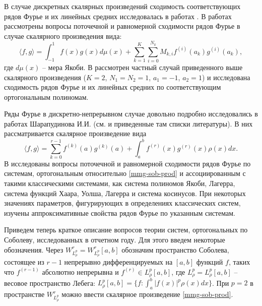 В случае дискретных скалярных произведений сходимость соответствующих рядов Фурье и их линейных средних исследовалась в работах \cite{mmg-Marcellan2002, mmg-Rocha2003, mmg-OsilenkerFourier2012, mmg-OsilenkerLinearMethods2015, mmg-OsilenkerFourier2022, mmg-Fejzullahu2009, mmg-CiaurriSigma2018}. В работах \cite{mmg-Marcellan2002, mmg-Rocha2003} рассмотрены вопросы поточечной и равномерной сходимости рядов Фурье в случае скалярного произведения вида:
\begin{equation*}
	\langle f,g \rangle = \int_{-1}^{1}f(x)g(x)d\mu(x)+
	\sum_{k=1}^K\sum_{i=0}^{N_k} M_{k,i}f^{(i)}(a_k)g^{(i)}(a_k),
\end{equation*}
где $d\mu(x)$ -- мера Якоби. В \cite{mmg-OsilenkerFourier2012, mmg-OsilenkerLinearMethods2015, mmg-Fejzullahu2009, mmg-CiaurriSigma2018} рассмотрен частный случай приведенного выше скалярного произведения ($K=2$, $N_1=N_2=1$, $a_1=-1$, $a_2=1$) и исследована сходимость рядов Фурье и их линейных средних по соответствующим ортогональным полиномам.

Ряды Фурье в дискретно-непрерывном случае довольно подробно исследовались в работах Шарапудинова И.И. (см. \cite{mmg-SharapudinovUMN, mmg-SharapudinovIzvRan2019} и приведенные там списки литературы). В них рассматривается скалярное произведение вида
\begin{equation}\label{mmg-sob-prod}
	\langle f, g \rangle = \sum_{k=0}^{r-1}f^{(k)}(a)g^{(k)}(a)+\int_a^b f^{(r)}(x)g^{(r)}(x)\rho(x)dx.
\end{equation}
В \cite{mmg-SharapudinovUMN, mmg-SharapudinovIzvRan2019, mmg-MMG2019, mmg-Gadzhimirzaev2019} исследованы вопросы поточечной и равномерной сходимости рядов Фурье по системам, ортогональным относительно \eqref{mmg-sob-prod} и ассоциированным с такими классическими системами, как система полиномов Якоби, Лагерра, система функций Хаара, Уолша, Лагерра и система косинусов. При некоторых значениях параметров, фигурирующих в определениях классических систем, изучены аппроксимативные свойства рядов Фурье по указанным системам.

Приведем теперь краткое описание вопросов теории систем, ортогональных по Соболеву, исследованных в отчетном году. Для этого введем некоторые обозначения.
Через $W^r_{L^p_\rho}=W^r_{L^p_\rho}[a,b]$ обозначим пространство Соболева, состоящее из $r-1$ непрерывно дифференцируемых на $[a,b]$ функций $f$, таких что $f^{(r-1)}$ абсолютно непрерывна и $f^{(r)} \in L^p_\rho[a,b]$, где $L^p_\rho=L^p_\rho[a,b]$ -- весовое пространство Лебега: $L^p_\rho[a,b] = \{ f: \int_a^b |f(x)|^p\rho(x)dx \}$. При $p=2$ в пространстве $W^r_{L^p_\rho}$ можно ввести скалярное произведение \ref{mmg-sob-prod}.

